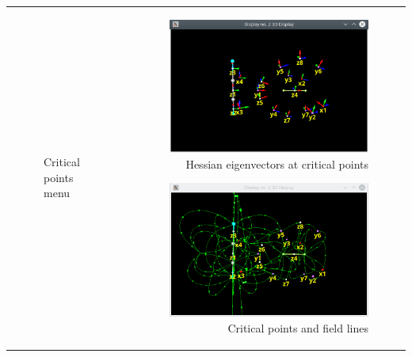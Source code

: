 \documentclass[10pt]{article}
\begin{document}
\begin{tabular}{lr}
\begin{minipage}{.4\linewidth}
\begin{figure}[H]
\begin{center}
        \end{center}
        \vspace*{1mm}
        \caption{Critical points menu \label{fig:4_13_8_1}}
    \end{figure}
\end{minipage}
&
\begin{minipage}{.6\linewidth}
    \begin{figure}[H]
        \begin{center}
            \includegraphics[width=0.65\linewidth]{damqt320_CPs_MESP.png} 
        \end{center}
        \vspace*{-1mm}
        \caption{Hessian eigenvectors at critical points \label{fig:4_13_8_2}}
    \end{figure}
    \begin{figure}[H]
        \begin{center}
            \includegraphics[width=0.65\linewidth]{damqt320_CPs_field.png} 
        \end{center}
        \vspace*{-1mm}
        \caption{Critical points and field lines \label{fig:4_13_8_3}}
    \end{figure}
\end{minipage}
\end{tabular}
\vspace*{5mm}
\end{document}
